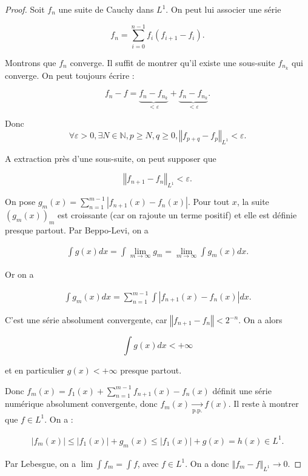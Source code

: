 \documentclass[french]{book}
\theoremstyle{definition}
\newcommand{\lesss}{<}
\newcommand{\less}{\lesss}
\newcommand{\biggg}{>}
\newcommand{\bg}{\biggg}
\begin{document}
\begin{proof}
  Soit \(f_n\) une suite de Cauchy dans \(L ^{1}\). On peut lui associer une série

  \[f_n = \sum_{i=0}^{n-1} f_i (f _{i+1} -f_i).\]

  Montrons que \(f_n\) converge. Il suffit de montrer qu'il existe une sous-suite \(f _{n_k}\) qui converge. On peut toujours écrire :

  \[f_n - f = \underbrace{f_n - f _{n_k}}_{\less \varepsilon}+ \underbrace{f_n - f _{n_k}}_{\less \varepsilon}.\]

  Donc \[\forall \varepsilon \bg 0, \exists N \in \mathbb{N}, p \geq  N, q \geq 0, \left\Vert f _{p+q} - f _{p} \right\Vert _{L ^{1}} \less \varepsilon.\]

  A extraction près d'une sous-suite, on peut supposer que

  \[\left\Vert f _{n+1}-f_n \right\Vert _{L ^{1}} \less \varepsilon.\]

  On pose \(g _{m}(x) = \displaystyle \sum_{n=1}^{m-1} \left\lvert f _{n+1}(x) - f_n(x) \right\rvert \). Pour tout \(x\), la suite \((g_m(x))_{m}\) est croissante (car on rajoute un terme positif) et elle est définie presque partout. Par Beppo-Levi, on a

  \begin{gather*}
    \int g(x) dx = \int \lim_{m \to \infty} g_m = \lim_{m \to \infty} \int g_m(x)dx.
  \end{gather*}

  Or on a

  \begin{gather*}
    \int g_m(x)dx = \sum_{n=1}^{m-1} \int \left\lvert f _{n+1}(x)-f_n(x) \right\rvert dx.
  \end{gather*}

  C'est une série absolument convergente, car \(\left\Vert f _{n+1}-f_n \right\Vert \less 2 ^{-n}\). On a alors

  \[\int g(x)dx \less +\infty\]

  et en particulier \(g(x) \less +\infty\) presque partout.

  Donc \(f_m(x) = f_1(x) + \displaystyle \sum_{n=1}^{m-1} f _{n+1}(x) - f_n(x)\) définit une série numérique absolument convergente, donc \(f_m(x) \underset{\text{p.p.}}{\longrightarrow} f(x)\). Il reste à montrer que \(f \in L ^{1}\). On a :

  \begin{gather*}
    \left\lvert f_m(x) \right\rvert \leq \left\lvert f_1(x) \right\rvert + g_m(x) \leq \left\lvert f_1(x) \right\rvert + g(x) = h(x) \in L ^{1}.
  \end{gather*}

  Par Lebesgue, on a \(\lim \int f_m = \int f\), avec \(f \in L ^{1}\). On a donc \(\left\Vert f_m - f \right\Vert _{L ^{1}} \longrightarrow 0\).
\end{proof}
\end{document}
